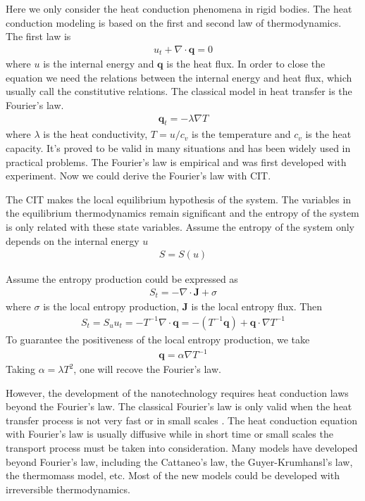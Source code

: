 \documentclass[a4paper]{article}
\begin{document}
Here we only consider the heat conduction phenomena in rigid bodies. The heat conduction modeling is based on the first and second law of thermodynamics. The first law is
\begin{eqnarray}
u_t+\nabla \cdot \mathbf{q}=0
\end{eqnarray}
where $u$ is the internal energy and $\mathbf{q}$ is the heat flux.
In order to close the equation we need the relations between the internal energy and heat flux, which usually call the constitutive relations. The classical model in heat transfer is the Fourier's law. 
\begin{eqnarray}
\mathbf{q}_t=-\lambda \nabla T
\end{eqnarray}
where $\lambda$ is the heat conductivity, $T=u/c_v$ is the temperature and $c_v$ is the heat capacity.
It's proved to be valid in many situations and has been widely used in practical problems. The Fourier's law is empirical and was first developed with experiment. Now we could derive the Fourier's law with CIT.

The CIT makes the local equilibrium hypothesis of the system. The variables in the equilibrium thermodynamics remain significant and the entropy of the system is only related with these state variables. Assume the entropy of the system only depends on the internal energy $u$
\begin{eqnarray}
S=S(u)
\end{eqnarray}

Assume the entropy production could be expressed as 
\begin{eqnarray}
S_t=-\nabla \cdot \mathbf{J} + \sigma
\end{eqnarray}
where $\sigma$ is the local entropy production, $\mathbf{J}$ is the local entropy flux.
Then
\begin{eqnarray}
S_t=S_u u_t = -T^{-1} \nabla \cdot \mathbf{q} = -(T^{-1} \mathbf{q})+ \mathbf{q} \cdot \nabla T^{-1}
\end{eqnarray}
To guarantee the positiveness of the local entropy production, we take
\begin{eqnarray}
\mathbf{q}=\alpha \nabla T^{-1}
\end{eqnarray}
Taking $\alpha={\lambda}{T^2}$, one will recove the Fourier's law.

 However, the development of the nanotechnology requires heat conduction laws beyond the Fourier's law. The classical Fourier's law is only valid when the heat transfer process is not very fast or in small scales \cite{Jou1996extended}. The heat conduction equation with Fourier's law is usually diffusive while in short time or small scales the transport process must be taken into consideration. Many models have developed beyond Fourier's law, including the Cattaneo's law, the Guyer-Krumhansl's law, the thermomass model, etc. Most of the new models could be developed with irreversible thermodynamics. 
 
\end{document}

